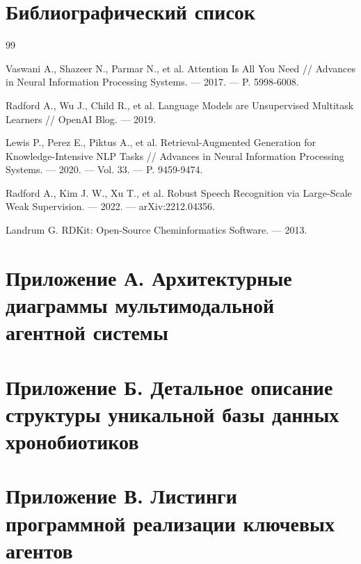 \documentclass{syksu-coursework}
\begin{document}
\newpage

\section*{Библиографический список}

\begin{thebibliography}{99}

     Vaswani A., Shazeer N., Parmar N., et al. Attention Is All You Need // Advances in Neural Information Processing Systems. — 2017. — P. 5998-6008.

     Radford A., Wu J., Child R., et al. Language Models are Unsupervised Multitask Learners // OpenAI Blog. — 2019.

     Lewis P., Perez E., Piktus A., et al. Retrieval-Augmented Generation for Knowledge-Intensive NLP Tasks // Advances in Neural Information Processing Systems. — 2020. — Vol. 33. — P. 9459-9474.

     Radford A., Kim J. W., Xu T., et al. Robust Speech Recognition via Large-Scale Weak Supervision. — 2022. — arXiv:2212.04356.

     Landrum G. RDKit: Open-Source Cheminformatics Software. — 2013.

\end{thebibliography}

\newpage

\section*{Приложение А. Архитектурные диаграммы мультимодальной агентной системы}

\newpage

\section*{Приложение Б. Детальное описание структуры уникальной базы данных хронобиотиков}

\newpage

\section*{Приложение В. Листинги программной реализации ключевых агентов}
\end{document}
